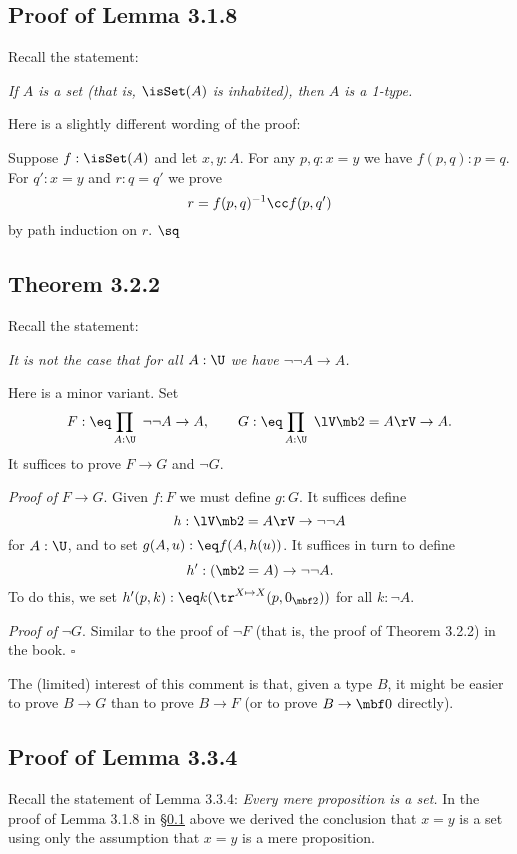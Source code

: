 \documentclass[12pt]{article}
\begin{document}
\subsection{Proof of Lemma 3.1.8}\label{318}

Recall the statement: 

\emph{If $A$ is a set (that is, $\isSet(A)$ is inhabited), then $A$ is a 1-type.} 

Here is a slightly different wording of the proof:

Suppose $f:\isSet(A)$ and let $x,y:A$. For any $p,q:x=y$ we have $f(p,q):p=q$. For $q':x=y$ and $r:q=q'$ we prove 
$$
r=f(p,q)^{-1}\cc f(p,q')
$$ 
by path induction on $r$. $\sq$


\subsection{Theorem 3.2.2} 

Recall the statement:

\nn\emph{It is not the case that for all $A:\U$ we have $\neg\neg A\to A$.}

Here is a minor variant. Set 
$$
F:\eq\prod_{A:\U}\ \neg\neg A\to A,\qquad G:\eq\prod_{A:\U}\ \lV\mb2=A\rV\to A.
$$ 
It suffices to prove $F\to G$ and $\neg G$. 

\nn\emph{Proof of} $F\to G$. Given $f:F$ we must define $g:G$. It suffices define 
$$
h:\lV\mb2=A\rV\to\neg\neg A
$$ 
for $A:\U$, and to set $g(A,u):\eq f(A,h(u))$. It suffices in turn to define 
$$
h':(\mb2=A)\to\neg\neg A.
$$ 
To do this, we set $h'(p,k):\eq k(\tr^{X\mapsto X}(p,0_{\mbf2}))$ for all $k:\neg A$. 

\nn\emph{Proof of} $\neg G$. Similar to the proof of $\neg F$ (that is, the proof of Theorem 3.2.2) in the book. $\square$

The (limited) interest of this comment is that, given a type $B$, it might be easier to prove $B\to G$ than to prove $B\to F$ (or to prove $B\to\mbf0$ directly). 


\subsection{Proof of Lemma 3.3.4}%

Recall the statement of Lemma 3.3.4: \emph{Every mere proposition is a set.} In the proof of Lemma 3.1.8 in \S\ref{318} above we derived the conclusion that $x=y$ is a set using only the assumption that $x=y$ is a mere proposition.
\end{document}
